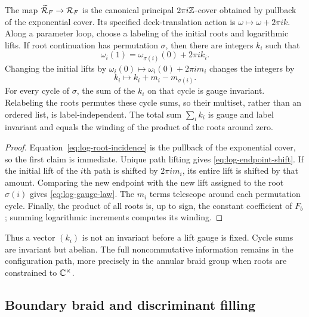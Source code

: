 \begin{theorem}
\label{thm:log-root-transport}
The map $\widetilde{\mathcal R}_F\to\mathcal R_F$ is the canonical principal
$2\pi i\mathbb{Z}$-cover obtained by pullback of the exponential cover.  Its specified
deck-translation action is $\omega\mapsto\omega+2\pi i k$.  Along a parameter
loop, choose a labeling of the initial roots and
logarithmic lifts.  If root continuation has permutation $\sigma$, then there are
integers $k_i$ such that
\begin{equation}
 \omega_i(1)=\omega_{\sigma(i)}(0)+2\pi i k_i.
 \label{eq:log-endpoint-shift}
\end{equation}
Changing the initial lifts by
$\omega_i(0)\mapsto\omega_i(0)+2\pi i m_i$ changes the integers by
\begin{equation}
 k_i\longmapsto k_i+m_i-m_{\sigma(i)}.
 \label{eq:log-gauge-law}
\end{equation}
For every cycle of $\sigma$, the sum of the $k_i$ on that cycle is gauge invariant.
Relabeling the roots permutes these cycle sums, so their multiset, rather than an
ordered list, is label-independent.  The total sum $\sum_i k_i$ is gauge and label
invariant and equals the winding of the product of the roots around zero.
\end{theorem}

\begin{proof}
Equation~\eqref{eq:log-root-incidence} is the pullback of the exponential cover,
so the first claim is immediate.  Unique path lifting gives
\eqref{eq:log-endpoint-shift}.  If the initial lift of the $i$th path is shifted by
$2\pi im_i$, its entire lift is shifted by that amount.  Comparing the new endpoint
with the new lift assigned to the root $\sigma(i)$ gives
\eqref{eq:log-gauge-law}.  The $m_i$ terms telescope around each permutation cycle.
Finally, the product of all roots is, up to sign, the constant coefficient of
$F_b$; summing logarithmic increments computes its winding.
\end{proof}

Thus a vector $(k_i)$ is not an invariant before a lift gauge is fixed.  Cycle sums
are invariant but abelian.  The full noncommutative information remains in the
configuration path, more precisely in the annular braid group when roots are
constrained to $\mathbb{C}^\times$.

\subsection{Boundary braid and discriminant filling}

